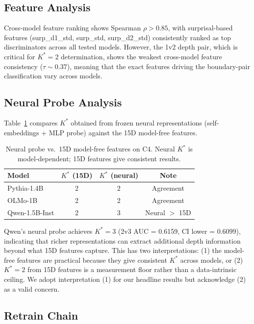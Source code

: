 \documentclass[11pt]{article}
\newcommand{\kstar}{K^*}
\begin{document}
\subsection{Feature Analysis}
\label{sec:features}

Cross-model feature ranking shows Spearman $\rho > 0.85$, with surprisal-based features (surp\_d1\_std, surp\_std, surp\_d2\_std) consistently ranked as top discriminators across all tested models. However, the 1v2 depth pair, which is critical for $\kstar{=}2$ determination, shows the weakest cross-model feature consistency ($\tau \sim 0.37$), meaning that the exact features driving the boundary-pair classification vary across models.

\subsection{Neural Probe Analysis}
\label{sec:neural}

Table~\ref{tab:neural} compares $\kstar$ obtained from frozen neural representations (self-embeddings + MLP probe) against the 15D model-free features.

\begin{table}[t]
\centering
\caption{Neural probe vs.\ 15D model-free features on C4. Neural $\kstar$ is model-dependent; 15D features give consistent results.}
\label{tab:neural}
\small
\begin{tabular}{lccc}
\toprule
Model & $\kstar$ (15D) & $\kstar$ (neural) & Note \\
\midrule
Pythia-1.4B & 2 & 2 & Agreement \\
OLMo-1B & 2 & 2 & Agreement \\
Qwen-1.5B-Inst & 2 & 3 & Neural $>$ 15D \\
\bottomrule
\end{tabular}
\end{table}

Qwen's neural probe achieves $\kstar{=}3$ (2v3 AUC = 0.6159, CI lower = 0.6099), indicating that richer representations can extract additional depth information beyond what 15D features capture. This has two interpretations: (1) the model-free features are practical because they give consistent $\kstar$ across models, or (2) $\kstar{=}2$ from 15D features is a measurement floor rather than a data-intrinsic ceiling. We adopt interpretation (1) for our headline results but acknowledge (2) as a valid concern.


\subsection{Retrain Chain}
\label{sec:retrain}
\end{document}
